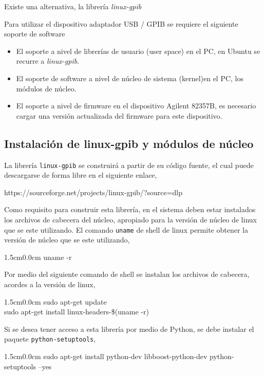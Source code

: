 \documentclass[paper=letter,oneside,fontsize=11pt, parskip=full]{scrartcl}
\newenvironment{code}
	{\begin{adjustwidth}{1.5cm}{0.0cm}\ttfamily}
	{\end{adjustwidth}}
\newenvironment{link}
	{\ttfamily}{}
\begin{document}
		Existe una alternativa, la librería \emph{linux-gpib} 
		
		Para utilizar el dispositivo adaptador USB / GPIB se requiere el siguiente soporte de software
		
		\begin{itemize}
			\item El soporte a nivel de librerías de usuario (user space) en el PC, en Ubuntu se recurre a \emph{linux-gpib}.
			\item El soporte de software a nivel de núcleo de sistema (kernel)en el PC, los módulos de núcleo.
			\item El soporte a nivel de firmware en el dispositivo Agilent 82357B, es necesario cargar una versión actualizada del firmware para este dispositivo.
		\end{itemize}
	
		\subsection{Instalación de linux-gpib y módulos de núcleo}
		
		La librería \texttt{linux-gpib} se construirá a partir de su código fuente, el cual puede descargarse de forma libre en el siguiente enlace,
		
		\begin{link}
			https://sourceforge.net/projects/linux-gpib/?source=dlp
		\end{link}
		
		Como requisito para construir esta librería, en el sistema deben estar instalados los archivos de cabecera del núcleo, apropiado para la versión de núcleo de linux que se este utilizando. El comando \texttt{uname} de shell de linux permite obtener la versión de núcleo que se este utilizando,
		
		\begin{code}
			uname -r
		\end{code}
		
		Por medio del siguiente comando de shell se instalan los archivos de cabecera, acordes a la versión de linux,
		
		\begin{code}
			sudo apt-get update		\\
			sudo apt-get install linux-headers-\$(uname -r)
		\end{code}
		
		Si se desea tener acceso a esta librería por medio de Python, se debe instalar el paquete \texttt{python-setuptools},
		\begin{code}		
			sudo apt-get install python-dev libboost-python-dev python-setuptools --yes
		\end{code}
			
\end{document}
